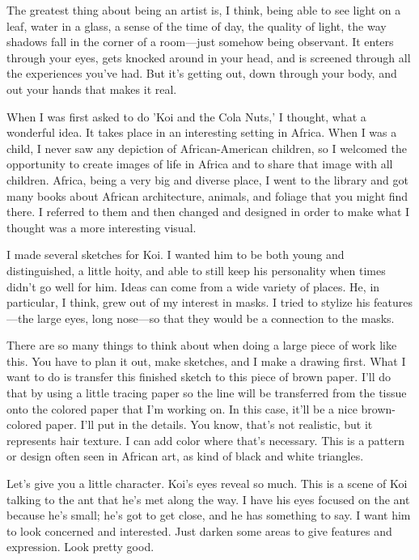 The greatest thing about being an artist is, I think, being able to see light on a leaf, water in a glass, a sense of the time of day, the quality of light, the way shadows fall in the corner of a room—just somehow being observant. It enters through your eyes, gets knocked around in your head, and is screened through all the experiences you've had. But it's getting out, down through your body, and out your hands that makes it real.

When I was first asked to do 'Koi and the Cola Nuts,' I thought, what a wonderful idea. It takes place in an interesting setting in Africa. When I was a child, I never saw any depiction of African-American children, so I welcomed the opportunity to create images of life in Africa and to share that image with all children. Africa, being a very big and diverse place, I went to the library and got many books about African architecture, animals, and foliage that you might find there. I referred to them and then changed and designed in order to make what I thought was a more interesting visual.

I made several sketches for Koi. I wanted him to be both young and distinguished, a little hoity, and able to still keep his personality when times didn't go well for him. Ideas can come from a wide variety of places. He, in particular, I think, grew out of my interest in masks. I tried to stylize his features—the large eyes, long nose—so that they would be a connection to the masks.

There are so many things to think about when doing a large piece of work like this. You have to plan it out, make sketches, and I make a drawing first. What I want to do is transfer this finished sketch to this piece of brown paper. I'll do that by using a little tracing paper so the line will be transferred from the tissue onto the colored paper that I'm working on. In this case, it'll be a nice brown-colored paper. I'll put in the details. You know, that's not realistic, but it represents hair texture. I can add color where that's necessary. This is a pattern or design often seen in African art, as kind of black and white triangles.

Let's give you a little character. Koi's eyes reveal so much. This is a scene of Koi talking to the ant that he's met along the way. I have his eyes focused on the ant because he's small; he's got to get close, and he has something to say. I want him to look concerned and interested. Just darken some areas to give features and expression. Look pretty good.

